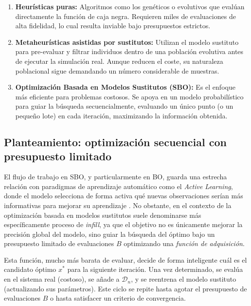 \begin{enumerate}
    \item \textbf{Heurísticas puras:} Algoritmos como los genéticos o evolutivos que evalúan directamente la función de caja negra. Requieren miles de evaluaciones de alta fidelidad, lo cual resulta inviable bajo presupuestos estrictos.
    \item \textbf{Metaheurísticas asistidas por sustitutos:} Utilizan el modelo sustituto para pre-evaluar y filtrar individuos dentro de una población evolutiva antes de ejecutar la simulación real. Aunque reducen el coste, su naturaleza poblacional sigue demandando un número considerable de muestras.
    \item \textbf{Optimización Basada en Modelos Sustitutos (SBO):} Es el enfoque más eficiente para problemas costosos. Se apoya en un modelo probabilístico para guiar la búsqueda secuencialmente, evaluando un único punto (o un pequeño lote) en cada iteración, maximizando la información obtenida.
\end{enumerate}

\subsection{Planteamiento: optimización secuencial con presupuesto limitado}
El flujo de trabajo en SBO, y particularmente en BO, guarda una estrecha relación con paradigmas de aprendizaje automático como el \textit{Active Learning}, donde el modelo selecciona de forma activa qué nuevas observaciones serían más informativas para mejorar su aprendizaje \cite{settles2009active}. No obstante, en el contexto de la optimización basada en modelos sustitutos suele denominarse más específicamente proceso de \emph{infill}, ya que el
objetivo no es únicamente mejorar la precisión global del modelo, sino guiar la búsqueda
del óptimo bajo un presupuesto limitado de evaluaciones $B$ optimizando una \textit{función de adquisición}. 

Esta función, mucho más barata de evaluar, decide de forma inteligente cuál es el candidato óptimo $x^*$ para la siguiente iteración. Una vez determinado, se evalúa en el sistema real (costoso), se añade a $\mathcal{D}_n$, y se reentrena el modelo sustituto (actualizando sus parámetros). Este ciclo se repite hasta agotar el presupuesto de evaluaciones $B$ o hasta satisfacer un criterio de convergencia.

